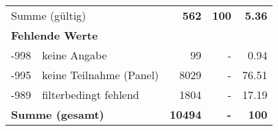\begin{longtable}{lXrrr}
     \midrule
     \multicolumn{2}{l}{Summe (gültig)} &
       \textbf{\num{562}} &
     \textbf{100} &
       \textbf{\num[round-mode=places,round-precision=2]{5,36}} \\
     \multicolumn{5}{l}{\textbf{Fehlende Werte}}\\
       -998 &
       keine Angabe &
         \num{99} &
        - &
         \num[round-mode=places,round-precision=2]{0,94} \\
       -995 &
       keine Teilnahme (Panel) &
         \num{8029} &
        - &
         \num[round-mode=places,round-precision=2]{76,51} \\
       -989 &
       filterbedingt fehlend &
         \num{1804} &
        - &
         \num[round-mode=places,round-precision=2]{17,19} \\
     \midrule
     \multicolumn{2}{l}{\textbf{Summe (gesamt)}} &
          \textbf{\num{10494}} &
        \textbf{-} &
        \textbf{100} \\
     \bottomrule
     \end{longtable}
     
